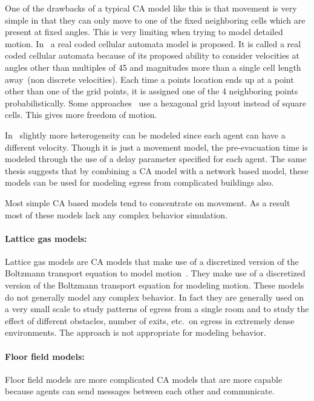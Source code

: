 One of the drawbacks of a typical CA model like this is that movement is very simple in that they can only move to one of the fixed neighboring cells which are present at fixed angles. This is very limiting when trying to model detailed motion. In~\cite{Yamamoto:2007dc} a real coded cellular automata model is proposed. It is called a real coded cellular automata because of its proposed ability to consider velocities at angles other than multiples of 45 and magnitudes more than a single cell length away~(non discrete velocities). Each time a points location ends up at a point other than one of the grid points, it is assigned one of the 4 neighboring points probabilistically. Some approaches~\cite{Klein:2009} use a hexagonal grid layout instead of square cells. This gives more freedom of motion.

In~\cite{Klupfel:2003wa} slightly more heterogeneity can be modeled since each agent can have a different velocity. Though it is just a movement model, the pre-evacuation time is modeled through the use of a delay parameter specified for each agent. The same thesis suggests that by combining a CA model with a network based model, these models can be used for modeling egress from complicated buildings also.

Most simple CA based models tend to concentrate on movement. As a result most of these models lack any complex behavior simulation.


\paragraph{Lattice gas models:}

Lattice gas models are CA models that make use of a discretized version of the Boltzmann transport equation to model motion~\cite{Marconi:2002ue,Marconi2002,Nagai:2004kl}. They make use of a discretized version of the Boltzmann transport equation for modeling motion. These models do not generally model any complex behavior. In fact they are generally used on a very small scale to study patterns of egress from a single room and to study the effect of different obstacles, number of exits, etc.\ on egress in extremely dense environments. The approach is not appropriate for modeling behavior.

\paragraph{Floor field models:}

Floor field models are more complicated CA models that are more capable because agents can send messages between each other and communicate.


